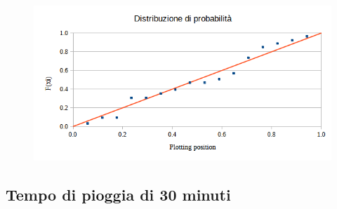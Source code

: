 \begin{figure}[H]\centering
    \includegraphics[scale=0.75]{immagini/distr_prob_15min.png}
\end{figure}

\subsection{Tempo di pioggia di 30 minuti}

